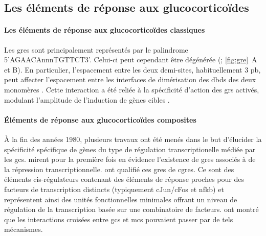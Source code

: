 \documentclass[../main.tex]{subfiles}
\begin{document}
\subsection{Les éléments de réponse aux glucocorticoïdes}

\paragraph{Les éléments de réponse aux glucocorticoïdes classiques}
Les \glspl{gre} sont principalement représentés par le palindrome 5'AGAACAnnnTGTTCT3'.
Celui-ci peut cependant être dégénérée (\citealp{Nordeen1990}; \autoref{fig:gre}~A et B).
En particulier, l'espacement entre les deux demi-sites, habituellement 3 \gls{pb}, peut affecter l'espacement entre les interfaces de dimérisation des \glspl{dbd} des deux monomères \citep{Watson2013}.
Cette interaction a été reliée à la spécificité d'action des \glspl{gr} activés, modulant l'amplitude de l'induction de gènes cibles \citep{Meijsing2009}.
	


\paragraph{Éléments de réponse aux glucocorticoïdes composites}
À la fin des années 1980, plusieurs travaux ont été menés dans le but d'élucider la spécificité spécifique de gènes du type de régulation transcriptionelle médiée par les \glspl{gc}.
\citet{Sakai1988} mirent pour la première fois en évidence l'existence de \glspl{gre} associés à de la répression transcriptionnelle.
\citet{Diamond1990} ont qualifié ces \glspl{gre} de \glspl{cgre}.
Ce sont des éléments cis-régulateurs contenant des éléments de réponse proches pour des facteurs de transcription distincts (typiquement cJun/cFos et \gls{nfkb}) et représentent ainsi des unités fonctionnelles minimales offrant un niveau de régulation de la transcription basée sur une combinatoire de facteurs.
\citet{Pearce1993} ont montré que les interactions croisées entre \glspl{gc} et \glspl{mc} pouvaient passer par de tels mécanismes.
\end{document}
